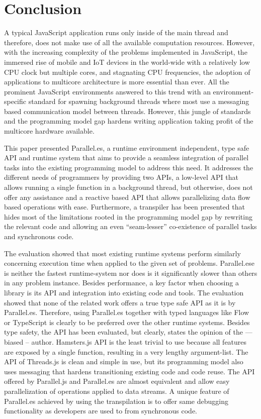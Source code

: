 \section{Conclusion}\label{sec:conclusion}
A typical JavaScript application runs only inside of the main thread and therefore, does not make use of all the available computation resources. However, with the increasing complexity of the problems implemented in JavaScript, the immersed rise of mobile and IoT devices in the world-wide with a relatively low CPU clock but multiple cores, and stagnating CPU frequencies, the adoption of applications to multicore architecture is more essential than ever. All the prominent JavaScript environments answered to this trend with an environment-specific standard for spawning background threads where most use a messaging based communication model between threads. However, this jungle of standards and the programming model gap hardens writing application taking profit of the multicore hardware available. 

This paper presented Parallel.es, a runtime environment independent, type safe API and runtime system that aims to provide a seamless integration of parallel tasks into the existing programming model to address this need. It addresses the different needs of programmers by providing two APIs, a low-level API that allows running a single function in a background thread, but otherwise, does not offer any assistance and a reactive based API that allows parallelizing data flow based operations with ease. Furthermore, a  transpiler has been presented that hides most of the limitations rooted in the programming model gap by rewriting the relevant code and allowing an even \enquote{seam-lesser} co-existence of parallel tasks and synchronous code. 

The evaluation showed that most existing runtime systems perform similarly concerning execution time when applied to the given set of problems. Parallel.ese is neither the fastest runtime-system nor does is it significantly slower than others in any problem instance. Besides performance, a key factor when choosing a library is its API and integration into existing code and tools. The evaluation showed that none of the related work offers a true type safe API as it is by Parallel.es. Therefore, using Parallel.es together with typed languages like Flow or TypeScript is clearly to be preferred over the other runtime systems. Besides type safety, the API has been evaluated, but clearly, states the opinion of the --- biased -- author. Hamsters.js API is the least trivial to use because all features are exposed by a single function, resulting in a very lengthy argument-list. The API of Threads.js is clean and simple in use, but its programming model also uses messaging that hardens transitioning existing code and code reuse. The API offered by Parallel.js and Parallel.es are almost equivalent and allow easy parallelization of operations applied to data streams. A unique feature of Parallel.es achieved by using the transpilation is to offer same debugging functionality as developers are used to from synchronous code. 


